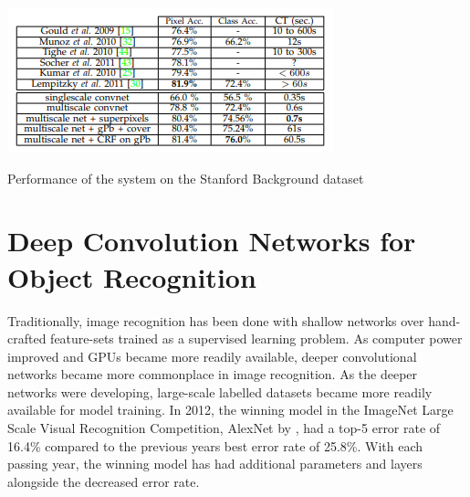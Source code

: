 \begin{table}[!ht]
  \includegraphics[width=\textwidth]{figs/StanfordBGDS8.png}
  \caption{Performance of the system on the Stanford Background dataset}
  \label{fig:sbgtable}
\end{table}

\section{Deep Convolution Networks for Object Recognition} \label{section:objectRecognition}
Traditionally, image recognition has been done with shallow networks over hand-crafted feature-sets trained as a supervised learning problem.  
As computer power improved and GPUs became more readily available, deeper convolutional networks became more commonplace in image recognition.  
As the deeper networks were developing, large-scale labelled datasets became more readily available for model training.  
In 2012, the winning model in the ImageNet Large Scale Visual Recognition Competition, AlexNet by \cite{Krizhevsky:2012:ICD:2999134.2999257}, had a top-5 error rate of 16.4\% compared to the previous years best error rate of 25.8\%.  
With each passing year, the winning model has had additional parameters and layers alongside the decreased error rate.

